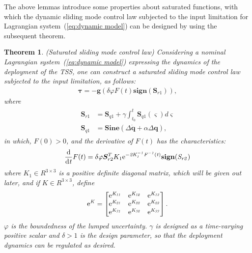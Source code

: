 \documentclass[3p]{elsarticle}
\theoremstyle{plain}
\newtheorem{mythm}{Theorem}
\theoremstyle{remark}
\begin{document}
The above lemmas introduce some properties about saturated functions, with which the dynamic sliding mode control law subjected to the input limitation for Lagrangian system~(\ref{eq:dynamic model}) can be designed by using the subsequent theorem.
\begin{mythm}\label{thm:1}(Saturated sliding mode control law)
Considering a nominal Lagrangian system~(\ref{eq:dynamic model}) expressing the dynamics of the deployment of the TSS, one can construct a saturated sliding mode control law subjected to the input limitation, as follows:
\begin{align}
\bm\tau = -\bm{g}(\delta\varphi F(t) \mathbf{sign}(\bm S_{r1})),\label{eq:slider control}
\end{align}
where
\begin{align}
\begin{split}
\bm S_{r1} &= \bm S_{q1}+\gamma\int^t_{t_0}\bm S_{q1}(\varsigma) d\varsigma\\
\bm S_{q1} &= \mathbf{Sine}(\Delta \dot {\bm q}+\alpha\Delta\bm q),
\end{split}
\end{align}
in which, $F(0)>0$, and the derivative of $F(t)$ has the characteristics:
\begin{align}
\frac{\rm{d}}{\rm{d}\it{t}}F(t) = \delta\varphi \bm S_{r2}^T K_1\rm{e}\it{^{-2K_1^{-1}F^{-1}(t)}}\mathbf{sign}(\bm S_{r2})
\end{align}
where $K_1\in R^{3\times 3}$ is a positive definite diagonal matrix, which will be given out later, and if $K\in R^{3\times 3}$, define
\begin{align}
\rm{e}\it{^K}=
\begin{bmatrix}
\rm{e}\it{^{K_{11}}}&\rm{e}\it{^{K_{12}}}&\rm{e}\it{^{K_{13}}}\\
\rm{e}\it{^{K_{21}}}&\rm{e}\it{^{K_{22}}}&\rm{e}\it{^{K_{23}}}\\
\rm{e}\it{^{K_{31}}}&\rm{e}\it{^{K_{32}}}&\rm{e}\it{^{K_{33}}}
\end{bmatrix}.
\end{align}
$\varphi$ is the boundedness of the lumped uncertainty. $\gamma$ is designed as a time-varying positive scalar and $\delta>1$ is the design parameter, so that the deployment dynamics can be regulated as desired.
\end{mythm}
\end{document}
